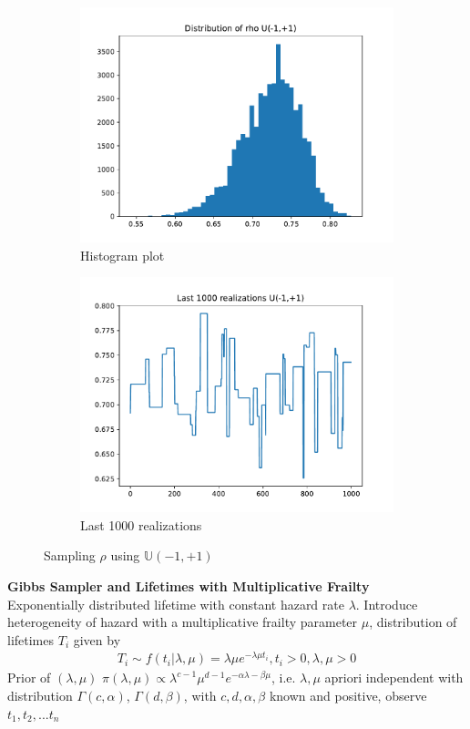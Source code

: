 \documentclass{homeworg}
\begin{document}
\begin{figure}[h]
	\centering
	\begin{subfigure}[b]{0.48\textwidth}
		\centering
		\includegraphics[width=\textwidth]{q1_partd1.pdf}
		\caption{Histogram plot}
	\end{subfigure}
	\hfill
	\begin{subfigure}[b]{0.48\textwidth}
		\centering
		\includegraphics[width=\textwidth]{q1_partd2.pdf}
		\caption{Last 1000 realizations}
	\end{subfigure}
	\caption{Sampling $\rho$ using $\mathbb{U}(-1,+1)$}
\end{figure}


\exercise 
\textbf{Gibbs Sampler and Lifetimes with Multiplicative Frailty} \\
Exponentially distributed lifetime with constant hazard rate $\lambda$. Introduce heterogeneity of hazard with a multiplicative frailty parameter $\mu$, distribution of lifetimes $T_i$ given by 
\begin{align*}
T_i\sim f(t_i|\lambda,\mu)=\lambda\mu e^{-\lambda\mu t_i}, t_i>0,\lambda,\mu>0
\end{align*}
Prior of $(\lambda,\mu)$ $\pi(\lambda,\mu)\propto \lambda^{c-1}\mu^{d-1}e^{-\alpha\lambda-\beta\mu}$, i.e. $\lambda,\mu$ apriori independent with distribution $\Gamma(c,\alpha)$, $\Gamma(d,\beta)$, with $c,d,\alpha,\beta$ known and positive, observe $t_1,t_2,...t_n$
\end{document}
